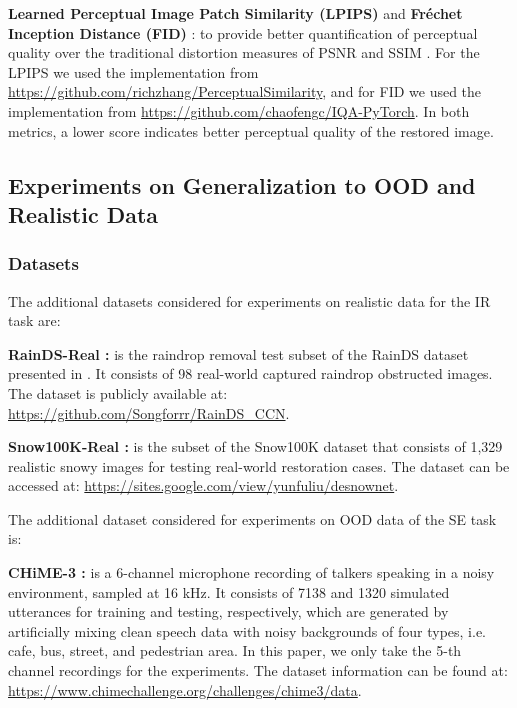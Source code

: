 \textbf{Learned Perceptual Image Patch Similarity (LPIPS)} \citep{zhang2018unreasonable} and \textbf{Fréchet Inception Distance (FID)} \citep{heusel2017gans}: to provide better quantification of perceptual quality over the traditional distortion measures of PSNR and SSIM \citep{blau2018perception,freirich2021theory}. For the LPIPS we used the implementation from \url{https://github.com/richzhang/PerceptualSimilarity}, and for FID we used the  implementation from \url{https://github.com/chaofengc/IQA-PyTorch}. In both metrics, a lower score indicates better perceptual quality of the restored image. 


\subsection{Experiments on Generalization to OOD and Realistic Data}

\subsubsection{Datasets}
The additional datasets considered for experiments on realistic data for the IR task are:

\noindent\textbf{RainDS-Real \citep{qian2018attentive}:} is the raindrop removal test subset of the RainDS dataset presented in  \citet{qian2018attentive}. It consists of 98 real-world captured raindrop obstructed images. The dataset is publicly available at: \url{https://github.com/Songforrr/RainDS_CCN}.

\noindent\textbf{Snow100K-Real \citep{liu2018desnownet}:} is the subset of the Snow100K dataset \citep{liu2018desnownet} that consists of 1,329 realistic snowy images for testing real-world restoration cases. The dataset can be accessed at: \url{https://sites.google.com/view/yunfuliu/desnownet}.

The additional dataset considered for experiments on OOD data of the SE task is:

\noindent\textbf{CHiME-3 \citep{barker2017third}:} is a 6-channel microphone recording of talkers speaking in a noisy environment, sampled at 16 kHz. It consists of 7138 and 1320 simulated utterances for training and testing, respectively, which are generated by artificially mixing clean speech data with noisy backgrounds of four types, i.e. cafe, bus, street, and pedestrian area. In this paper, we only take the 5-th channel recordings for the experiments. The dataset information can be found at: \url{https://www.chimechallenge.org/challenges/chime3/data}.


